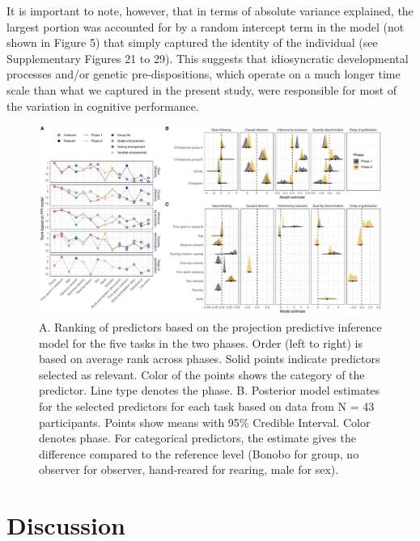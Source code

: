 \documentclass[
  man,floatsintext]{apa6}
\begin{document}
It is important to note, however, that in terms of absolute variance explained, the largest portion was accounted for by a random intercept term in the model (not shown in Figure 5) that simply captured the identity of the individual (see Supplementary Figures 21 to 29). This suggests that idiosyncratic developmental processes and/or genetic pre-dispositions, which operate on a much longer time scale than what we captured in the present study, were responsible for most of the variation in cognitive performance.

\begin{figure}

{\centering \includegraphics[width=1\linewidth]{./figures/ppi3_i7} 

}

\caption{A. Ranking of predictors based on the projection predictive inference model for the five tasks in the two phases. Order (left to right) is based on average rank across phases. Solid points indicate predictors selected as relevant. Color of the points shows the category of the predictor. Line type denotes the phase. B. Posterior model estimates for the selected predictors for each task based on data from N = 43 participants. Points show means with 95\% Credible Interval. Color denotes phase. For categorical predictors, the estimate gives the difference compared to the reference level (Bonobo for group, no observer for observer, hand-reared for rearing, male for sex).}\label{fig:ppiplot}
\end{figure}

\hypertarget{discussion}{%
\section{Discussion}\label{discussion}}
\end{document}
